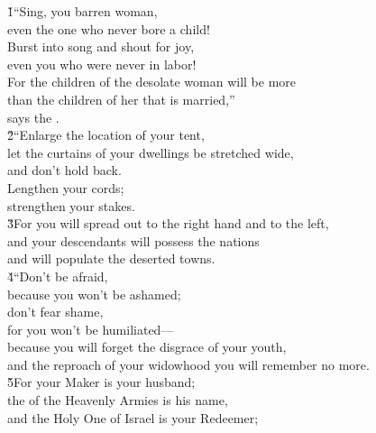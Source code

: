 \begin{poetry}
\poeml {}
\v{1}``Sing, you barren woman, \\
\poemll    even the one who never bore a child! \\
\poeml Burst into song and shout for joy, \\
\poemll    even you who were never in labor! \\
\poeml For the children of the desolate woman will be more \\
\poemll    than the children of her that is married,'' \\
\poemlll       says the . \\
\poeml \v{2}``Enlarge the location of your tent, \\
\poemll    let the curtains of your dwellings be stretched wide, \\
\poemlll       and don't hold back. \\
\poeml Lengthen your cords; \\
\poemlll       strengthen your stakes. \\
\poeml \v{3}For you will spread out to the right hand and to the left, \\
\poemll    and your descendants will possess the nations \\
\poemlll       and will populate the deserted towns. \\
\poeml \v{4}``Don't be afraid, \\
\poemll    because you won't be ashamed; \\
\poeml don't fear shame, \\
\poemll    for you won't be humiliated--- \\
\poeml because you will forget the disgrace of your youth, \\
\poemll    and the reproach of your widowhood you will remember no more. \\
\poeml \v{5}For your Maker is your husband; \\
\poemll    the  of the Heavenly Armies is his name, \\
\poeml and the Holy One of Israel is your Redeemer; \\

\end{poetry}
